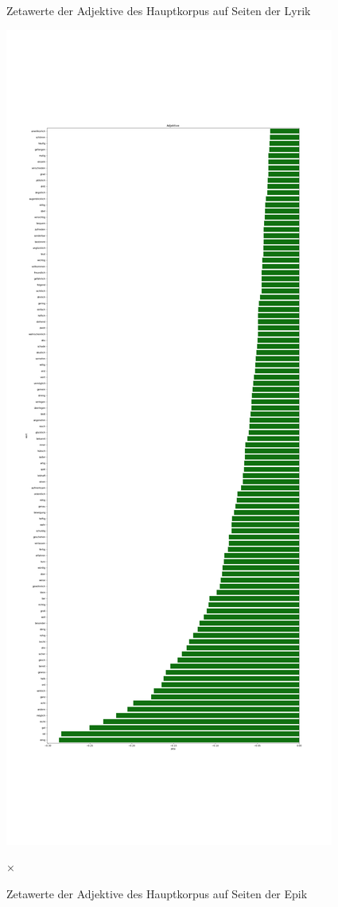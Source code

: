 \documentclass[a4paper,10p]{article}
\begin{document}
\begin{figure}{}
\begin{minipage}[b]{.45\linewidth}
        \caption{Zetawerte der Adjektive des Hauptkorpus auf Seiten der Lyrik}
        \label{haupt_adjektive}
    \end{minipage}
    \hfill
    \begin{minipage}[b]{.45\linewidth}
        \centering
        \includegraphics[width=\linewidth]{haupt_adjektive_pro_wort2.png}
        \caption{Zetawerte der Adjektive des Hauptkorpus  auf Seiten der Epik}
        \label{haupt_adjektive2}×
    \end{minipage}
\end{figure}
\end{document}

